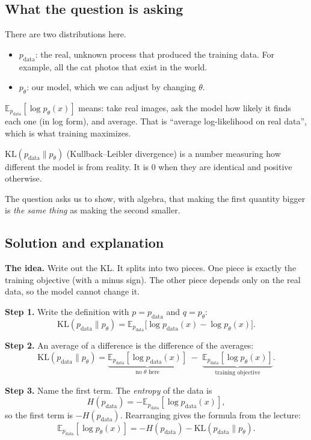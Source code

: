 \documentclass[12pt,a4paper]{article}
\begin{document}
\subsection{What the question is asking}

There are two distributions here.
\begin{itemize}[leftmargin=*]
\item $p_{\text{data}}$: the real, unknown process that produced the training data. For example, all the cat photos that exist in the world.
\item $p_\theta$: our model, which we can adjust by changing $\theta$.
\end{itemize}

$\mathbb{E}_{p_{\text{data}}}[\log p_\theta(x)]$ means: take real images, ask the model how likely it finds each one (in log form), and average. That is ``average log-likelihood on real data'', which is what training maximizes.

$\mathrm{KL}(p_{\text{data}}\|p_\theta)$ (Kullback--Leibler divergence) is a number measuring how different the model is from reality. It is 0 when they are identical and positive otherwise.

The question asks us to show, with algebra, that making the first quantity bigger is \emph{the same thing} as making the second smaller.

\subsection{Solution and explanation}

\textbf{The idea.} Write out the KL. It splits into two pieces. One piece is exactly the training objective (with a minus sign). The other piece depends only on the real data, so the model cannot change it.

\textbf{Step 1.} Write the definition with $p = p_{\text{data}}$ and $q = p_\theta$:
\[
\mathrm{KL}(p_{\text{data}}\|p_\theta) = \mathbb{E}_{p_{\text{data}}}\big[\log p_{\text{data}}(x) - \log p_\theta(x)\big].
\]

\textbf{Step 2.} An average of a difference is the difference of the averages:
\[
\mathrm{KL}(p_{\text{data}}\|p_\theta) = \underbrace{\mathbb{E}_{p_{\text{data}}}[\log p_{\text{data}}(x)]}_{\text{no } \theta \text{ here}} \;-\; \underbrace{\mathbb{E}_{p_{\text{data}}}[\log p_\theta(x)]}_{\text{training objective}}.
\]

\textbf{Step 3.} Name the first term. The \emph{entropy} of the data is
\[
H(p_{\text{data}}) = -\mathbb{E}_{p_{\text{data}}}[\log p_{\text{data}}(x)],
\]
so the first term is $-H(p_{\text{data}})$. Rearranging gives the formula from the lecture:
\[
\mathbb{E}_{p_{\text{data}}}[\log p_\theta(x)] = -H(p_{\text{data}}) - \mathrm{KL}(p_{\text{data}}\|p_\theta).
\]
\end{document}
